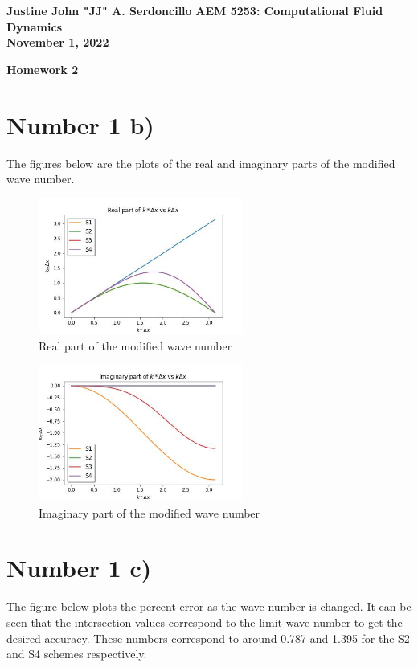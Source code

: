 \documentclass{article}
\begin{document}
	
	\noindent\textbf{Justine John "JJ" A. Serdoncillo}
	\hfill \textbf{AEM 5253: Computational Fluid Dynamics} \\ \hfill \textbf{November 1, 2022}
	
	\begin{center}
		\Large{\textbf{Homework 2}}    
	\end{center}
	
	\section*{Number 1 b)}
	The figures below are the plots of the real and imaginary parts of the modified wave number.
	
	\begin{figure}[H]
		\centering
		\includegraphics[width=0.6\textwidth]{real.jpg}
		\caption{\label{} Real part of the modified wave number }
	\end{figure}

	\begin{figure}[H]
		\centering
		\includegraphics[width=0.6\textwidth]{imag.jpg}
		\caption{\label{} Imaginary part of the modified wave number }
	\end{figure}

	\section*{Number 1 c)}
	The figure below plots the percent error as the wave number is changed. It can be seen that the intersection values correspond to the limit wave number to get the desired accuracy. These numbers correspond to around 0.787 and 1.395 for the S2 and S4 schemes respectively.
\end{document}
